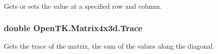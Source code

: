Gets or sets the value at a specified row and column. 

\hypertarget{struct_open_t_k_1_1_matrix4x3d_aff4c9982503c4a88a031aa05e0aa28dc}{
\subsubsection[{Trace}]{\setlength{\rightskip}{0pt plus 5cm}double Open\-T\-K.\-Matrix4x3d.\-Trace\hspace{0.3cm}{\ttfamily [get]}}}\label{struct_open_t_k_1_1_matrix4x3d_aff4c9982503c4a88a031aa05e0aa28dc}


Gets the trace of the matrix, the sum of the values along the diagonal. 

